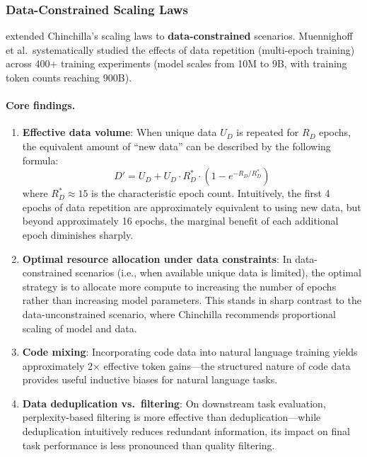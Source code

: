 \subsubsection{Data-Constrained Scaling Laws}
\label{sec:t7-scaling-data}

 extended Chinchilla's scaling laws to
\textbf{data-constrained} scenarios.
Muennighoff et al.\ systematically studied the effects of data repetition (multi-epoch training)
across 400+ training experiments
(model scales from 10M to 9B, with training token counts reaching 900B).

\paragraph{Core findings.}
\begin{enumerate}[leftmargin=2em]
  \item \textbf{Effective data volume}:
    When unique data $U_D$ is repeated for $R_D$ epochs,
    the equivalent amount of ``new data'' can be described by the following formula:
    \begin{equation}
    D' = U_D + U_D \cdot R_D^* \cdot \left(1 - e^{-R_D / R_D^*}\right)
    \label{eq:effective-data}
    \end{equation}
    where $R_D^* \approx 15$ is the characteristic epoch count.
    Intuitively, the first 4 epochs of data repetition are approximately equivalent to using new data,
    but beyond approximately 16 epochs, the marginal benefit of each additional epoch diminishes sharply.

  \item \textbf{Optimal resource allocation under data constraints}:
    In data-constrained scenarios (i.e., when available unique data is limited),
    the optimal strategy is to allocate more compute to increasing the number of epochs
    rather than increasing model parameters.
    This stands in sharp contrast to the data-unconstrained scenario,
    where Chinchilla recommends proportional scaling of model and data.

  \item \textbf{Code mixing}:
    Incorporating code data into natural language training yields approximately 2$\times$
    effective token gains---the structured nature of code data provides useful inductive biases for natural language tasks.

  \item \textbf{Data deduplication vs.\ filtering}:
    On downstream task evaluation,
    perplexity-based filtering is more effective than deduplication---while deduplication intuitively reduces redundant information,
    its impact on final task performance is less pronounced than quality filtering.
\end{enumerate}

